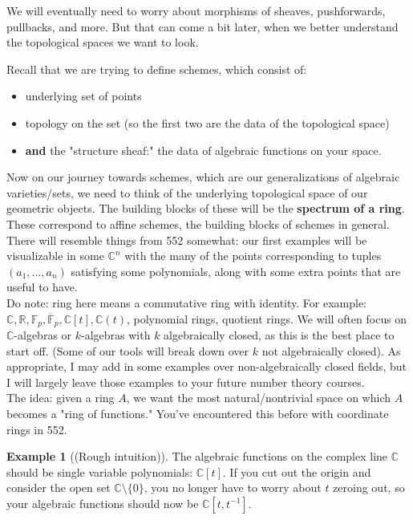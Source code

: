 \documentclass[10pt,reqno]{amsart}
\theoremstyle{definition}
\newtheorem{example}[theorem]{Example}
\theoremstyle{remark}
\numberwithin{equation}{section}
\numberwithin{theorem}{section}
\newcommand{\C}{{\mathbb C}}
\newcommand{\F}{{\mathbb F}}
\newcommand{\R}{{\mathbb R}}
\begin{document}
We will eventually need to worry about morphisms of sheaves, pushforwards, pullbacks, and more. But that can come a bit later, when we better understand the topological spaces we want to look.

Recall that we are trying to define schemes, which consist of:

\begin{itemize}
\item underlying set of points
\item topology on the set (so the first two are the data of the topological space)
\item \textbf{and} the "structure sheaf:" the data of algebraic functions on your space.
\end{itemize}

Now on our journey towards schemes, which are our generalizations of algebraic varieties/sets, we need to think of the underlying topological space of our geometric objects. The building blocks of these will be the \textbf{spectrum of a ring}. These correspond to affine schemes, the building blocks of schemes in general.
\\

There will resemble things from 552 somewhat: our first examples will be visualizable in some $\C^n$ with the many of the points corresponding to tuples $(a_1,\dots,a_n)$ satisfying some polynomials, along with some extra points that are useful to have.
\\

Do note: ring here means a commutative ring with identity. For example: $\C,\R, \F_p, \overline{\F}_p, \C[t], \C(t)$, polynomial rings, quotient rings. We will often focus on $\C$-algebras or $k$-algebras with $k$ algebraically closed, as this is the best place to start off. (Some of our tools will break down over $k$ not algebraically closed). As appropriate, I may add in some examples over non-algebraically closed fields, but I will largely leave those examples to your future number theory courses.
\\

The idea: given a ring $A$, we want the most natural/nontrivial space on which $A$ becomes a "ring of functions." You've encountered this before with coordinate rings in 552.

\begin{example}[(Rough intuition)] The algebraic functions on the complex line $\C$ should be single variable polynomials: $\C[t]$. If you cut out the origin and consider the open set $\C \setminus \{0\}$, you no longer have to worry about $t$ zeroing out, so your algebraic functions should now be $\C[t,t^{-1}]$.
\end{example}
\end{document}
